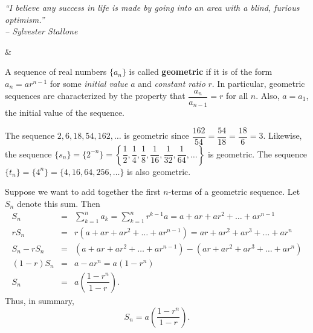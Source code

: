 \documentclass{book}
\begin{document}
\begin{center} 
\emph{``I believe any success in life is made by going into an area with a blind, furious optimism.''\\ -- Sylvester Stallone}
\end{center}

\begin{Videos}
 &
\end{Videos}

\begin{Def} A sequence of real numbers $\{a_n\}$ is called \textbf{geometric} if it is of the form $a_n = ar^{n-1}$ for some \emph{initial value} $a$ and \emph{constant ratio} $r$. In particular, geometric sequences are characterized by the property that $\dfrac{a_n}{a_{n-1}} = r$ for all $n$. Also, $a = a_1$, the initial value of the sequence.
\end{Def}\vs

\begin{Exam} The sequence $2, 6, 18, 54, 162,\ldots$ is geometric since $\dfrac{162}{54} = \dfrac{54}{18} = \dfrac{18}{6} = 3$. Likewise, the sequence $\{s_n\} = \{2^{-n}\} = \left\{\dfrac{1}{2}, \dfrac{1}{4}, \dfrac{1}{8}, \dfrac{1}{16}, \dfrac{1}{32}, \dfrac{1}{64}, \ldots \right\}$ is geometric. The sequence $\{t_n\} = \{4^n\} = \{4, 16, 64, 256, \ldots\}$ is also geometric. 
\end{Exam}\vs

Suppose we want to add together the first $n$-terms of a geometric sequence. Let $S_n$ denote this sum. Then 
\begin{eqnarray*}
S_n &=& \sum_{k=1}^n a_k = \sum_{k=1}^n r^{k-1}a = a+ar+ar^2 + \ldots + ar^{n-1}\\
rS_n &=& r(a+ar+ar^2 + \ldots + ar^{n-1}) = ar + ar^2 + ar^3 + \ldots + ar^n\\
S_n - rS_n &=& (a+ar+ar^2 + \ldots + ar^{n-1}) - (ar + ar^2 + ar^3 + \ldots + ar^n)\\
(1-r)S_n &=& a - ar^n = a(1-r^n)\\
S_ n &=& a\left(\dfrac{1-r^n}{1-r}\right).
\end{eqnarray*} Thus, in summary, \begin{equation} S_n = a\left(\dfrac{1-r^n}{1-r}\right).\end{equation}
\end{document}

